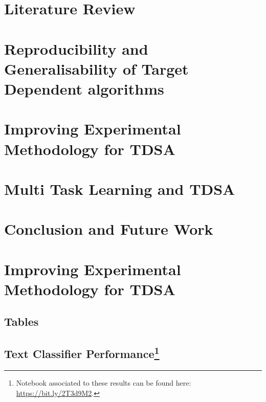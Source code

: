 \documentclass[11pt]{report}
\begin{document}
\chapter{Literature Review}
\label{chapter:lit_review}

\chapter{Reproducibility and Generalisability of Target Dependent algorithms}
\label{chapter:reproducibility}

\chapter{Improving Experimental Methodology for TDSA}

\chapter{Multi Task Learning and TDSA}
\chapter{Conclusion and Future Work}
\appendix
\chapter{Improving Experimental Methodology for TDSA}
\section{Tables}

\section{Text Classifier Performance\footnote{Notebook associated to these results can be found here: \url{https://bit.ly/2T3d9M2}.}}
\label{section:appendix_cnn_tdsa_baseline}

\end{document}

